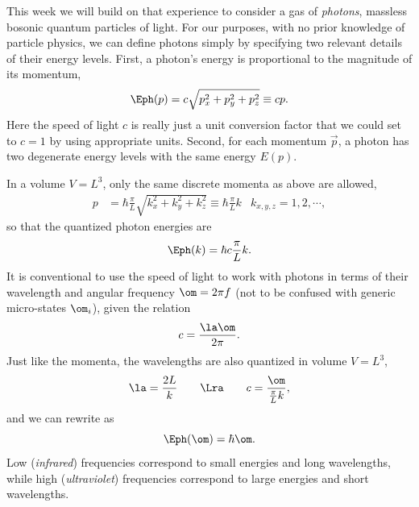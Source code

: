 This week we will build on that experience to consider a gas of \textit{photons}, massless bosonic quantum particles of light.
For our purposes, with no prior knowledge of particle physics, we can define photons simply by specifying two relevant details of their energy levels.
First, a photon's energy is proportional to the magnitude of its momentum, %
\begin{equation*}
  \Eph(p) = c \sqrt{p_x^2 + p_y^2 + p_z^2} \equiv c p.
\end{equation*}
Here the speed of light $c$ is really just a unit conversion factor that we could set to $c = 1$ by using appropriate units.
Second, for each momentum $\vec p$, a photon has two degenerate energy levels with the same energy $E(p)$. %

In a volume $V = L^3$, only the same discrete momenta as above are allowed,
\begin{align*}
  p & = \hbar \frac{\pi}{L} \sqrt{k_x^2 + k_y^2 + k_z^2} \equiv \hbar \frac{\pi}{L} k &
  k_{x, y, z} = 1, 2, \cdots,
\end{align*}
so that the quantized photon energies are
\begin{equation}
  \label{eq:photon_Ek}
  \Eph(k) = \hbar c \frac{\pi}{L} k.
\end{equation}
It is conventional to use the speed of light to work with photons in terms of their wavelength \la and angular frequency $\om = 2\pi f$ (not to be confused with generic micro-states $\om_i$), given the relation
\begin{equation*}
  c = \frac{\la \om}{2\pi}.
\end{equation*}
Just like the momenta, the wavelengths \la are also quantized in volume $V = L^3$,
\begin{equation*}
  \la = \frac{2L}{k} \qquad \Lra \qquad c = \frac{\om}{\frac{\pi}{L} k},
\end{equation*}
and we can rewrite  as
\begin{equation}
  \label{eq:photon_omega}
  \Eph(\om) = \hbar \om.
\end{equation}
Low (\textit{infrared}) frequencies correspond to small energies and long wavelengths, while high (\textit{ultraviolet}) frequencies correspond to large energies and short wavelengths.

